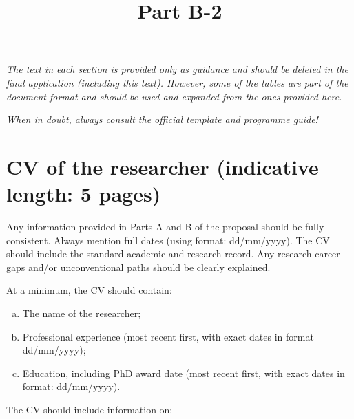 \documentclass[11pt,draftproposal]{msca-pf}
\title{Part B-2}
\author{}
\date{}
\begin{document}
\maketitle

\textit{The text in each section is provided only as guidance and should be deleted
in the final application (including this text). However, some of the tables
are part of the document format and should be used and expanded from the ones
provided here.}

\textit{When in doubt, always consult the official template and programme guide!}

\section{CV of the researcher (indicative length: 5 pages)}
\label{sc:cv}

Any information provided in Parts A and B of the proposal should be fully consistent.
Always mention full dates (using format: dd/mm/yyyy). The CV should include the
standard academic and research record. Any research career gaps and/or unconventional
paths should be clearly explained.

At a minimum, the CV should contain:

\begin{enumerate}[a)]
    \item The name of the researcher;
    \item Professional experience (most recent first, with exact dates in format
    dd/mm/yyyy);
    \item Education, including PhD award date (most recent first, with exact
    dates in format: dd/mm/yyyy).
\end{enumerate}

The CV should include information on:
\end{document}
